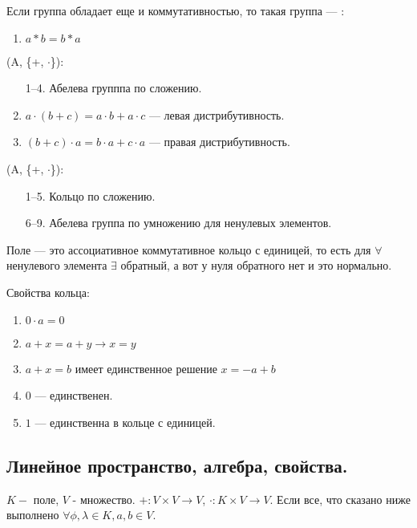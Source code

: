 Если группа обладает еще и коммутативностью, то такая группа --- :

\begin{enumerate}[resume]
    \item $a * b = b * a$
\end{enumerate}

 (A, \{+, $\cdot$\}):

\begin{enumerate}
    \item[1--4.] Абелева групппа по сложению.
    \setcounter{enumi}{4}
    \item $a \cdot (b+c) = a\cdot b + a\cdot c$ --- левая дистрибутивность.
    \item $(b+c)\cdot a  = b \cdot a + c \cdot a$  --- правая дистрибутивность.
\end{enumerate}

  (A, \{+, $\cdot$\}):
\begin{enumerate}
    \item[1--5.] Кольцо по сложению.
    \item[6--9.] Абелева группа по умножению для ненулевых элементов.
\end{enumerate}

Поле --- это ассоциативное коммутативное кольцо с единицей, то есть для $\forall$ ненулевого элемента $\exists$ обратный, а вот у нуля обратного нет и это нормально.

Свойства кольца:

\begin{enumerate}
    \item $0 \cdot a = 0$
    \item $a+x = a+ y \rightarrow x=y$
    \item $a + x = b$ имеет единственное решение $x = -a + b$
    \item $0$ --- единственен.
    \item $1$ --- единственна в кольце с единицей.
\end{enumerate}

\subsection{Линейное пространство, алгебра, свойства.}

$K - $ поле, $V$ - множество. $+: V \times V \rightarrow V$, $\cdot: K\times V \rightarrow V$. Если все, что сказано ниже выполнено  $\forall \phi, \lambda \in K, a,b \in V$.

